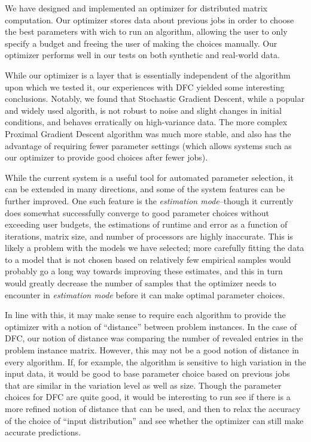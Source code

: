 We have designed and implemented an optimizer for distributed matrix 
computation. Our optimizer stores data about previous jobs in order to
choose the best parameters with wich to run an algorithm, allowing 
the user to only specify a budget and freeing the user of making 
the choices manually. Our optimizer performs well in our tests on both 
synthetic and real-world data.

While our optimizer is a layer that is essentially independent of 
the algorithm upon which we tested it, our experiences with DFC
yielded some interesting conclusions. Notably, we found that Stochastic
Gradient Descent, while a popular and widely used algorith, %
is not robust to noise and slight changes in initial conditions, and behaves
erratically on high-variance data. The more complex Proximal Gradient
Descent algorithm was much more stable, and also has the advantage of
requiring fewer parameter settings (which allows systems such as our
optimizer to provide good choices after fewer jobs).

While the current system is a useful tool for automated parameter selection,
it can be extended in many directions, and some of the system features
can be further improved. One such feature is the 
{\em estimation mode}--though it currently does somewhat successfully
converge to good parameter choices without exceeding user 
budgets, the estimations of runtime and error as a function of iterations,
matrix size, and number of processors are highly inaccurate. This is 
likely a problem with the models we have selected; more carefully fitting
the data to a model that is not chosen based on relatively few empirical
samples would probably go a long way towards improving these estimates,
and this in turn would greatly decrease the number of samples that 
the optimizer needs to encounter in {\em estimation mode} before it can
make optimal parameter choices. 

In line with this, it may make sense to require each algorithm to provide 
the optimizer with a notion of ``distance'' between problem instances.
In the case of DFC, our notion of distance was comparing the number
of revealed entries in the problem instance matrix. However, this may
not be a good notion of distance in every algorithm. If, for example, the 
algorithm is sensitive to high variation in the input data, it would be
good to base parameter choice based on previous jobs that are similar
in the variation level as well as size. Though the parameter choices for
DFC are quite good, it would be interesting to run see if there is a 
more refined notion of distance that can be used, and then to relax the
accuracy of the choice of ``input distribution'' and see whether the 
optimizer can still make accurate predictions.

